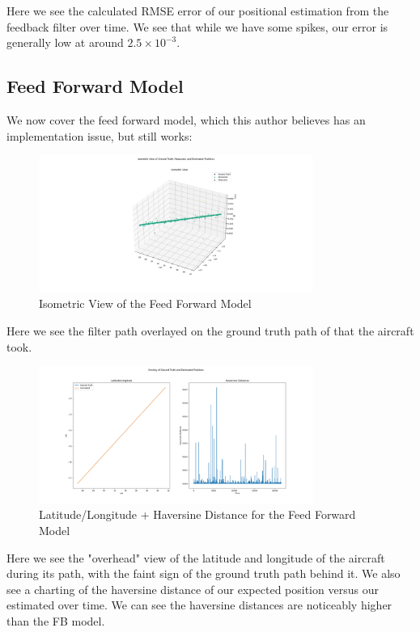 \documentclass{article}
\begin{document}
Here we see the calculated RMSE error of our positional estimation from the feedback filter over time. We see that while we have some spikes, our error is generally low at around $2.5\times10^{-3}$.

\subsection*{Feed Forward Model}

We now cover the feed forward model, which this author believes has an implementation issue, but still works:

\begin{figure}[H]
    \centering
    \includegraphics[width=0.8\textwidth]{./imgs/FF_isometric.png}
    \caption{Isometric View of the Feed Forward Model}
\end{figure}

Here we see the filter path overlayed on the ground truth path of that the aircraft took.

\begin{figure}[H]
    \centering
    \includegraphics[width=0.8\textwidth]{./imgs/FF_latlon_haversines.png}
    \caption{Latitude/Longitude + Haversine Distance for the Feed Forward Model}
\end{figure}

Here we see the "overhead" view of the latitude and longitude of the aircraft during its path, with the faint sign of the ground truth path behind it. We also see a charting of the haversine distance of our expected position versus our estimated over time. We can see the haversine distances are noticeably higher than the FB model.
\end{document}
